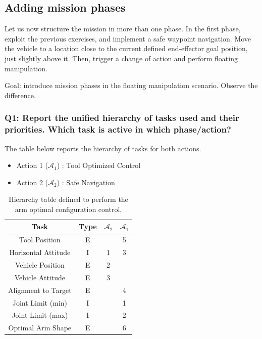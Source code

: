 \documentclass{article}
\begin{document}
\subsection{Adding mission phases}
Let us now structure the mission in more than one phase. In the first phase, exploit the previous exercises, and implement a safe waypoint navigation. Move the vehicle to a location close to the current defined end-effector goal position, just slightly above it. Then, trigger a change of action and perform floating manipulation.

Goal: introduce mission phases in the floating manipulation scenario. Observe the difference.

\subsubsection{Q1: Report the unified hierarchy of tasks used and their priorities. Which task is active in which phase/action?}
The table below reports the hierarchy of tasks for both actions. 

\begin{table}[htb]
	\caption{Hierarchy table defined to perform the arm optimal configuration control.}
	\begin{itemize}
		\item Action 1 ($\mathcal{A}_{1}$) : Tool Optimized Control
		\item Action 2 ($\mathcal{A}_{2}$) : Safe Navigation 
	\end{itemize}
	\label{tb8:ex5.2.1HierarchyTable}
	\begin{center}
		\footnotesize
		\begin{tabular}{cccc}
			\toprule
			Task & Type & $\mathcal{A}_{2}$ & $\mathcal{A}_{1}$ \\			
			\midrule
			Tool Position                   & E &    &	5	\\
			\hdashline
			Horizontal Attitude             & I & 1  &	3	\\
			\hdashline
			Vehicle Position        		& E & 2  &	 	\\
			\hdashline
			Vehicle Attitude        		& E & 3  &	 	\\
			\hdashline
			Alignment to Target           	& E &    &	4	\\
			\hdashline
			Joint Limit (min)               & I &    &	1	\\
			\hdashline
			Joint Limit (max)               & I &    &	2	\\
			\hdashline
			Optimal Arm Shape				& E &    &	6	\\
			\bottomrule
		\end{tabular}
	\end{center}
\end{table}
\end{document}
